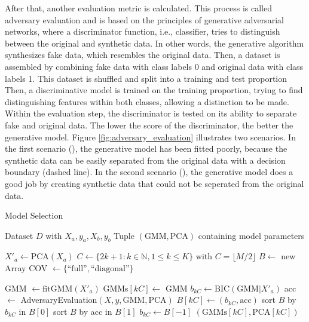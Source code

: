 After that, another evaluation metric is calculated. This process is called adversary evaluation and is based on the principles of generative adversarial networks, where a discriminator function, i.e., classifier, tries to distinguish between the original and synthetic data. In other words, the generative algorithm synthesizes fake data, which resembles the original data. Then, a dataset is assembled by combining fake data with class labels 0 and original data with class labels 1. This dataset is shuffled and split into a training and test proportion Then, a discriminative model is trained on the training proportion, trying to find distinguishing features within both classes, allowing a distinction to be made. Within the evaluation step, the discriminator is tested on its ability to separate fake and original data. The lower the score of the discriminator, the better the generative model. Figure \ref{fig:adversary_evaluation} illustrates two scenarios. In the first scenario (), the generative model has been fitted poorly, because the synthetic data can be easily separated from the original data with a decision boundary (dashed line). In the second scenario (), the generative model does a good job by creating synthetic data that could not be seperated from the original data.

 \begin{algorithm}
    \caption{Model Selection}
    \label{alg:model_selection}
 
    \begin{algorithmic}[1]
        \REQUIRE Dataset $D$ with $X_a, y_a, X_b, y_b$
        \ENSURE Tuple $(\text{GMM}, \text{PCA})$ containing model parameters

        \STATE $X'_a \leftarrow \text{PCA}(X_a)$
        \STATE $C \leftarrow \{2k+1: k \in \mathbb{N}, 1 \leq k \leq K\}$ with $C=\lfloor M / 2 \rfloor$
        \STATE $B \leftarrow$ new Array
        \STATE COV $\leftarrow \{ \text{``full''}, \text{``diagonal''} \}$

                \STATE GMM $\leftarrow \text{fitGMM}(X'_a)$
                \STATE GMMs$[kC] \leftarrow$ GMM
                \STATE $b_{kC} \leftarrow \text{BIC}(\text{GMM}|X'_a)$
                \STATE acc $\leftarrow$ AdversaryEvaluation$(X, y, \text{GMM}, \text{PCA})$
                \STATE $B[kC] \leftarrow (b_{kC}, \text{acc})$
            \ENDFOR
        \ENDFOR
        \STATE sort $B$ by $b_{kC}$ in $B[0]$
        \STATE sort $B$ by acc in $B[1]$
        \STATE $b_{kC} \leftarrow B[-1]$
        \RETURN $(\text{GMMs}[kC], \text{PCA}[kC])$
    \end{algorithmic}
 \end{algorithm}

